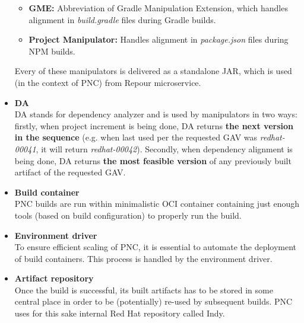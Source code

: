 \documentclass[../main.tex]{subfiles}
\begin{document}
\begin{itemize}
\begin{itemize}
        \item \textbf{GME:} Abbreviation of Gradle Manipulation Extension, which handles alignment in \textit{build.gradle} files during Gradle builds.

        \item \textbf{Project Manipulator:} Handles alignment in \textit{package.json} files during NPM builds.
    \end{itemize}

    Every of these manipulators is delivered as a standalone JAR, which is used (in the context of PNC) from Repour microservice.

    \item \textbf{DA}\\
    DA stands for dependency analyzer and is used by manipulators in two ways: firstly, when project increment is being done, DA returns \textbf{the next version in the sequence} (e.g. when last used per the requested GAV was \textit{redhat-00041}, it will return \textit{redhat-00042}). Secondly, when dependency alignment is being done, DA returns \textbf{the most feasible version} of any previously built artifact of the requested GAV.

    \item \textbf{Build container}\\
    PNC builds are run within minimalistic OCI container containing just enough tools (based on build configuration) to properly run the build.

    \item \textbf{Environment driver}\\
    To ensure efficient scaling of PNC, it is essential to automate the deployment of build containers. This process is handled by the environment driver.

    \item \textbf{Artifact repository}\\
    Once the build is successful, its built artifacts has to be stored in some central place in order to be (potentially) re-used by subsequent builds. PNC uses for this sake internal Red Hat repository called Indy.

\end{itemize}
\end{document}
